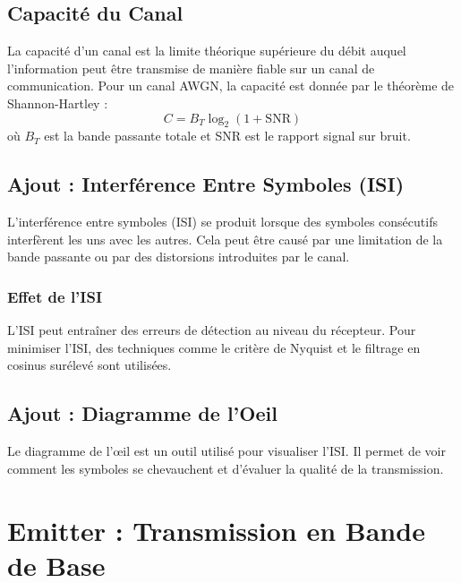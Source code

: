 \documentclass[10pt,a4paper]{article}
\begin{document}
\subsection*{Capacité du Canal}
La capacité d'un canal est la limite théorique supérieure du débit auquel l'information peut être transmise de manière fiable sur un canal de communication. Pour un canal AWGN, la capacité est donnée par le théorème de Shannon-Hartley :
\[ C = B_T \log_2(1 + \text{SNR}) \]
où $B_T$ est la bande passante totale et SNR est le rapport signal sur bruit.

\subsection*{Ajout : Interférence Entre Symboles (ISI)}
L'interférence entre symboles (ISI) se produit lorsque des symboles consécutifs interfèrent les uns avec les autres. Cela peut être causé par une limitation de la bande passante ou par des distorsions introduites par le canal.

\subsubsection*{Effet de l'ISI}
L'ISI peut entraîner des erreurs de détection au niveau du récepteur. Pour minimiser l'ISI, des techniques comme le critère de Nyquist et le filtrage en cosinus surélevé sont utilisées.

\subsection*{Ajout : Diagramme de l'Oeil}
Le diagramme de l'œil est un outil utilisé pour visualiser l'ISI. Il permet de voir comment les symboles se chevauchent et d'évaluer la qualité de la transmission.


\section*{Emitter : Transmission en Bande de Base}
\end{document}
